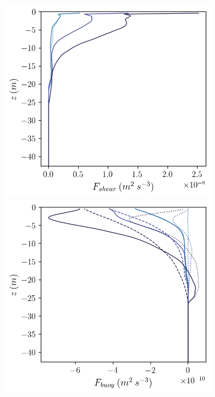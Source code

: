 \documentclass[draft]{agujournal2019}
\begin{document}
\begin{figure}
\begin{minipage}{0.5\textwidth}
        \includegraphics[trim={0 0 0 0},clip,width=\textwidth]{Figures/Fshear_cmp_dslope_43h_tav13h_z_profile.png}    
    \end{minipage}
    \newline
    \begin{minipage}{0.5\textwidth}
        \includegraphics[trim={0 0 0 0},clip,width=\textwidth]{Figures/Fbuoy_cmp_dslope_43h_tav13h_z_profile.png}

\end{minipage}
\end{figure}
\end{document}
